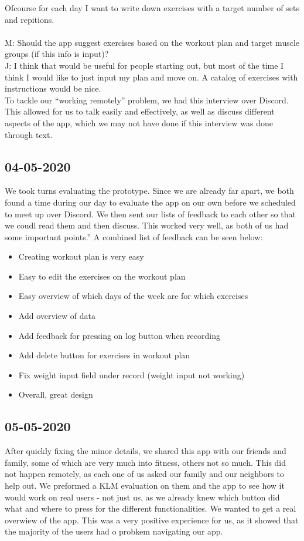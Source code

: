 \documentclass{article}
\begin{document}
Ofcourse for each day I want to write down exercises with a target number of sets and repitions.
\\ \\
M: Should the app suggest exercises based on the workout plan and target muscle groups (if this info is input)?\\
J: I think that would be useful for people starting out, but most of the time I think I would like to just input my plan and move on. A catalog of exercises with instructions would be nice.\\

To tackle our ``working remotely'' problem, we had this interview over Discord. This allowed for us to talk easily and effectively, as well as discuss different aspects of the app, which we may not have done if this interview was done through text.

\subsection*{04-05-2020}
We took turns evaluating the prototype. Since we are already far apart, we both found a time during our day to evaluate the app on our own before we scheduled to meet up over Discord. We then sent our lists of feedback to each other so that we coudl read them and then discuss. This worked very well, as both of us had some important points.''
A combined list of feedback can be seen below:
\begin{itemize}
\item Creating workout plan is very easy
\item Easy to edit the exercises on the workout plan
\item Easy overview of which days of the week are for which exercises
\item Add overview of data
\item Add feedback for pressing on log button when recording
\item Add delete button for exercises in workout plan
\item Fix weight input field under record (weight input not working)
\item Overall, great design
\end{itemize}

\subsection*{05-05-2020}
After quickly fixing the minor details, we shared this app with our friends and family, some of which are very much into fitness, others not so much. This did not happen remotely, as each one of us asked our family and our neighbors to help out. We preformed a KLM evaluation on them and the app to see how it would work on real users - not just us, as we already knew which button did what and where to press for the different functionalities. We wanted to get a real overwiew of the app. This was a very positive experience for us, as it showed that the majority of the users had o probkem navigating our app.
\end{document}
